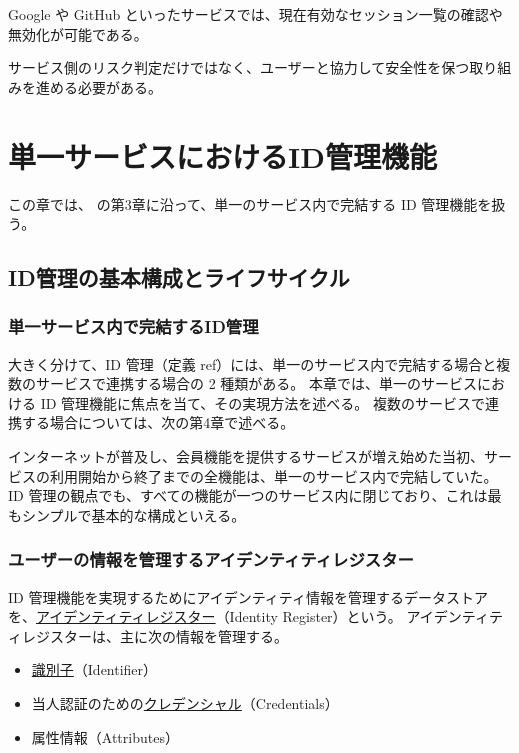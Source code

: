 \documentclass[uplatex]{jsarticle}
\def\ref#1{ref}%
\def\label#1{}%
\begin{document}
\begin{exa}[有効なセッション一覧の確認と無効化]\label{exa:ch2b-session-list}
Google や GitHub といったサービスでは、現在有効なセッション一覧の確認や無効化が可能である。
\end{exa}

サービス側のリスク判定だけではなく、ユーザーと協力して安全性を保つ取り組みを進める必要がある。

\section{単一サービスにおけるID管理機能}

この章では、\cite{Ito2026} の第3章に沿って、単一のサービス内で完結する ID 管理機能を扱う。

\subsection{ID管理の基本構成とライフサイクル}

\subsubsection{単一サービス内で完結するID管理}

大きく分けて、ID 管理（定義 \ref{dfn:identity-management}）には、単一のサービス内で完結する場合と複数のサービスで連携する場合の 2 種類がある。
本章では、単一のサービスにおける ID 管理機能に焦点を当て、その実現方法を述べる。
複数のサービスで連携する場合については、次の第4章で述べる。

インターネットが普及し、会員機能を提供するサービスが増え始めた当初、サービスの利用開始から終了までの全機能は、単一のサービス内で完結していた。
ID 管理の観点でも、すべての機能が一つのサービス内に閉じており、これは最もシンプルで基本的な構成といえる。

\subsubsection{ユーザーの情報を管理するアイデンティティレジスター}

\begin{dfn}[アイデンティティレジスター]\label{dfn:identity-register}
ID 管理機能を実現するためにアイデンティティ情報を管理するデータストアを、\underline{アイデンティティレジスター}（Identity Register）という。
アイデンティティレジスターは、主に次の情報を管理する。
\begin{itemize}
\item \underline{識別子}（Identifier）
\item 当人認証のための\underline{クレデンシャル}（Credentials）
\item 属性情報（Attributes）
\end{itemize}
\end{dfn}
\end{document}
